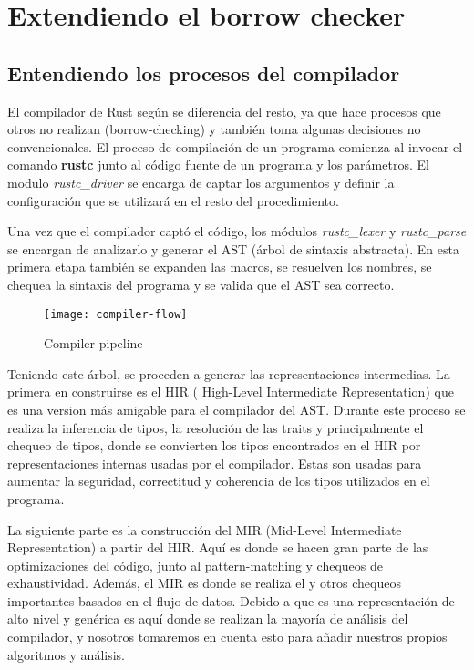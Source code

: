 \chapter{Extendiendo el borrow checker}

\section{Entendiendo los procesos del compilador}

El compilador de Rust según \cite{rustcdevelopment} se diferencia del resto, ya que hace procesos que otros no realizan (borrow-checking) y también toma algunas decisiones no convencionales. El proceso de compilación de un programa comienza al invocar el comando \textbf{rustc} junto al código fuente de un programa y los parámetros. El modulo \textit{rustc\_driver} se encarga de captar los argumentos y definir la configuración que se utilizará en el resto del procedimiento.

Una vez que el compilador captó el código, los módulos \textit{rustc\_lexer} y \textit{rustc\_parse} se encargan de analizarlo y generar el AST (árbol de sintaxis abstracta). En esta primera etapa también se expanden las macros, se resuelven los nombres, se chequea la sintaxis del programa y se valida que el AST sea correcto.

\begin{wrapfigure}{r}{0.25\textwidth}
    \caption{Compiler pipeline}
    \centering
    \texttt{[image: compiler-flow]}
\end{wrapfigure}

Teniendo este árbol, se proceden a generar las representaciones intermedias. La primera en construirse es el HIR ( High-Level Intermediate Representation) que es una version más amigable para el compilador del AST. Durante este proceso se realiza la inferencia de tipos, la resolución de las traits y principalmente el chequeo de tipos, donde se convierten los tipos encontrados en el HIR por representaciones internas usadas por el compilador. Estas son usadas para aumentar la seguridad, correctitud y coherencia de los tipos utilizados en el programa.

La siguiente parte es la construcción del MIR (Mid-Level Intermediate Representation) a partir del HIR. Aquí es donde se hacen gran parte de las optimizaciones del código, junto al pattern-matching y chequeos de exhaustividad. Además, el MIR es donde se realiza el  y otros chequeos importantes basados en el flujo de datos. Debido a que es una representación de alto nivel y genérica es aquí donde se realizan la mayoría de análisis del compilador, y nosotros tomaremos en cuenta esto para añadir nuestros propios algoritmos y análisis.

